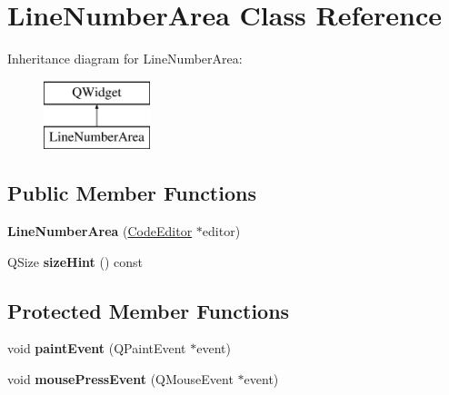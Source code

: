 \hypertarget{class_line_number_area}{}\section{Line\+Number\+Area Class Reference}
\label{class_line_number_area}
Inheritance diagram for Line\+Number\+Area\+:\begin{figure}[H]
\begin{center}
\leavevmode
\includegraphics[height=2.000000cm]{class_line_number_area}
\end{center}
\end{figure}
\subsection*{Public Member Functions}
\begin{DoxyCompactItemize}
\item 
\hypertarget{class_line_number_area_afc09bd40180955642bf5fc3ae2e41ecc}{}{\bfseries Line\+Number\+Area} (\hyperlink{class_code_editor}{Code\+Editor} $\ast$editor)\label{class_line_number_area_afc09bd40180955642bf5fc3ae2e41ecc}

\item 
\hypertarget{class_line_number_area_a5d31f7fb107bc1eefd7ae4974c095308}{}Q\+Size {\bfseries size\+Hint} () const \label{class_line_number_area_a5d31f7fb107bc1eefd7ae4974c095308}

\end{DoxyCompactItemize}
\subsection*{Protected Member Functions}
\begin{DoxyCompactItemize}
\item 
\hypertarget{class_line_number_area_a56400934bfe272427deb3ffd975b3a7f}{}void {\bfseries paint\+Event} (Q\+Paint\+Event $\ast$event)\label{class_line_number_area_a56400934bfe272427deb3ffd975b3a7f}

\item 
\hypertarget{class_line_number_area_a856443cc79937f836ed2e9bbae3cb118}{}void {\bfseries mouse\+Press\+Event} (Q\+Mouse\+Event $\ast$event)\label{class_line_number_area_a856443cc79937f836ed2e9bbae3cb118}

\end{DoxyCompactItemize}
